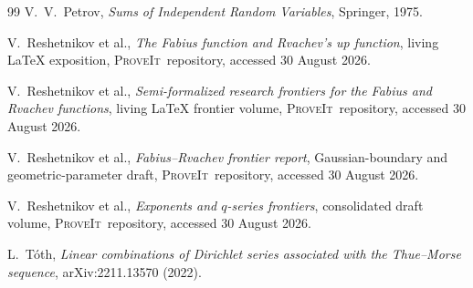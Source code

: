 \documentclass[11pt]{article}
\numberwithin{equation}{section}
\theoremstyle{definition}
\newcommand{\repo}{\textsc{ProveIt}}
\begin{document}
\begin{thebibliography}{99}
V.~V.~Petrov,
\newblock \emph{Sums of Independent Random Variables},
\newblock Springer, 1975.

V.~Reshetnikov et al.,
\newblock \emph{The Fabius function and Rvachev's up function}, living LaTeX exposition,
\newblock \repo\ repository, accessed 30 August 2026.

V.~Reshetnikov et al.,
\newblock \emph{Semi-formalized research frontiers for the Fabius and Rvachev functions}, living LaTeX frontier volume,
\newblock \repo\ repository, accessed 30 August 2026.

V.~Reshetnikov et al.,
\newblock \emph{Fabius--Rvachev frontier report}, Gaussian-boundary and geometric-parameter draft,
\newblock \repo\ repository, accessed 30 August 2026.

V.~Reshetnikov et al.,
\newblock \emph{Exponents and \(q\)-series frontiers}, consolidated draft volume,
\newblock \repo\ repository, accessed 30 August 2026.

L.~T\'oth,
\newblock \emph{Linear combinations of Dirichlet series associated with the Thue--Morse sequence},
\newblock arXiv:2211.13570 (2022).

\end{thebibliography}
\end{document}
